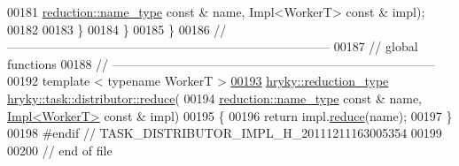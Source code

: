 \begin{DoxyCode}
00181         \hyperlink{classhryky_1_1reduction_1_1_string}{reduction::name_type} \textcolor{keyword}{const} & name, Impl<WorkerT> \textcolor{keyword}{const} & impl);
00182 
00183 \}
00184 \}
00185 \}
00186 \textcolor{comment}{//
      ------------------------------------------------------------------------------}
00187 \textcolor{comment}{// global functions}
00188 \textcolor{comment}{//
      ------------------------------------------------------------------------------}
00192 \textcolor{comment}{}\textcolor{keyword}{template} < \textcolor{keyword}{typename} WorkerT >
\hypertarget{task__distributor__impl_8h_source_l00193}{}\hyperlink{group__task_gaee44063e86225742b935c19f76d7d7c4}{00193} \hyperlink{classhryky_1_1_intrusive_ptr}{hryky::reduction_type} \hyperlink{group__task_ga89a7a92c43485c438438ab4b97184a27}{hryky::task::distributor::reduce}(
00194     \hyperlink{classhryky_1_1reduction_1_1_string}{reduction::name_type} \textcolor{keyword}{const} & name, \hyperlink{classhryky_1_1task_1_1distributor_1_1_impl}{Impl<WorkerT>} \textcolor{keyword}{const} & impl)
00195 \{
00196     \textcolor{keywordflow}{return} impl.\hyperlink{group__task_ga0170ebe627b3f2a67912e5b237994b9d}{reduce}(name);
00197 \}
00198 \textcolor{preprocessor}{#endif // TASK\_DISTRIBUTOR\_IMPL\_H\_20111211163005354}
00199 \textcolor{preprocessor}{}
00200 \textcolor{comment}{// end of file}
\end{DoxyCode}
